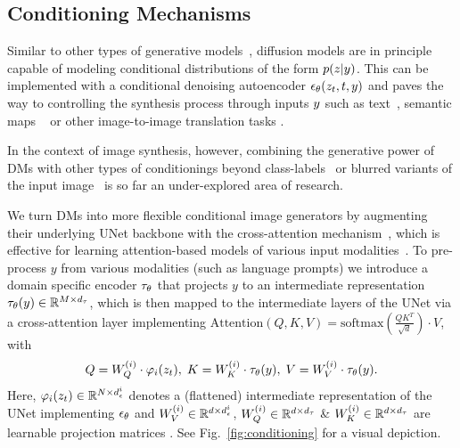 \documentclass[10pt,twocolumn,letterpaper]{article}
\begin{document}
%
%
%
%
%
%
%
%
%
%
%
%
%
%
%
%

%
%
%
%

%
%
%
\smallsamples
\subsection{Conditioning Mechanisms}
%
\label{subsec:conditioning}
\vspace{-0.5em}
%
Similar to other types of generative
models~\cite{DBLP:journals/corr/MirzaO14,NIPS2015_8d55a249}, diffusion models
are in principle capable of modeling conditional distributions of the form
$p(z \vert y)$.
This can be implemented with
a conditional denoising autoencoder $\epsilon_\theta(z_{t},t,y)$ and
%
paves the way to controlling the synthesis process through
inputs $y$ such as text~\cite{Reed2016GenerativeAT}, semantic maps ~\cite{spade, DBLP:conf/cvpr/IsolaZZE17} or other image-to-image translation tasks \cite{Isola2017ImagetoImageTW}.
 
 In the context of image synthesis, however, combining the
  generative power of DMs with other types of conditionings beyond class-labels~\cite{DBLP:journals/corr/abs-2105-05233} 
or blurred variants
 of the input image~\cite{DBLP:journals/corr/abs-2104-07636}
  is so far an under-explored area of research.
%
%
%
%

We turn DMs into more flexible conditional image generators by
augmenting their underlying UNet backbone with the cross-attention mechanism~\cite{DBLP:conf/nips/VaswaniSPUJGKP17}, 
%
which 
%
is
effective for learning attention-based models of various input modalities~\cite{DBLP:conf/icml/JaegleGBVZC21,DBLP:journals/corr/abs-2107-14795}. 
%
%
To pre-process $y$ from various modalities (such as language prompts) we introduce a domain specific 
encoder $\tau_\theta$ that projects $y$ to an intermediate representation $\tau_\theta(y) \in \mathbb{R}^{M\times d_\tau}$, which 
is then mapped to the intermediate layers of the UNet via a cross-attention
layer implementing $\text{Attention}(Q, K, V) = \text{softmax}\left(\frac{QK^T}{\sqrt{d}}\right) \cdot V$, with
\begin{equation*}
Q = W^{(i)}_Q \cdot  \varphi_i(z_t), \; K = W^{(i)}_K \cdot \conditioner(y),
  \; V = W^{(i)}_V \cdot \conditioner(y) . \nonumber
%
\end{equation*}
Here, $\varphi_i(z_t) \in \mathbb{R}^{N \times d^i_\epsilon}$ denotes a (flattened) intermediate representation of the UNet implementing 
$\epsilon_\theta$ and $W^{(i)}_V \in \mathbb{R}^{d \times d^i_\epsilon}$, $W^{(i)}_Q \in \mathbb{R}^{d \times d_\tau} $ \& $W^{(i)}_K \in \mathbb{R}^{d \times d_\tau}$ are learnable projection matrices \cite{DBLP:conf/nips/VaswaniSPUJGKP17, DBLP:conf/icml/JaegleGBVZC21}. See Fig.~\ref{fig:conditioning} for a visual depiction.
\end{document}
